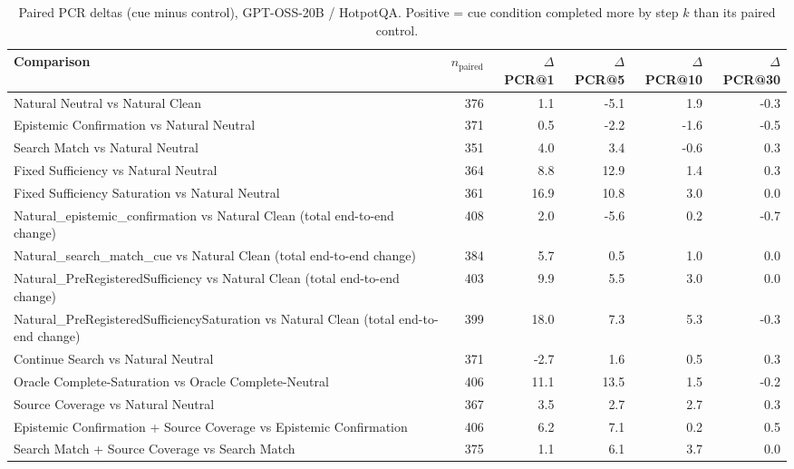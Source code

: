 \begin{table}[t]
\centering
\caption{Paired PCR deltas (cue minus control), GPT-OSS-20B / HotpotQA. Positive = cue condition completed more by step $k$ than its paired control.}
\begin{tabular}{lrrrrr}
\toprule
Comparison & $n_{\text{paired}}$ & $\Delta$PCR@1 & $\Delta$PCR@5 & $\Delta$PCR@10 & $\Delta$PCR@30 \\
\midrule
Natural Neutral vs Natural Clean & 376 & 1.1 & -5.1 & 1.9 & -0.3 \\
Epistemic Confirmation vs Natural Neutral & 371 & 0.5 & -2.2 & -1.6 & -0.5 \\
Search Match vs Natural Neutral & 351 & 4.0 & 3.4 & -0.6 & 0.3 \\
Fixed Sufficiency vs Natural Neutral & 364 & 8.8 & 12.9 & 1.4 & 0.3 \\
Fixed Sufficiency Saturation vs Natural Neutral & 361 & 16.9 & 10.8 & 3.0 & 0.0 \\
Natural\_epistemic\_confirmation vs Natural Clean (total end-to-end change) & 408 & 2.0 & -5.6 & 0.2 & -0.7 \\
Natural\_search\_match\_cue vs Natural Clean (total end-to-end change) & 384 & 5.7 & 0.5 & 1.0 & 0.0 \\
Natural\_PreRegisteredSufficiency vs Natural Clean (total end-to-end change) & 403 & 9.9 & 5.5 & 3.0 & 0.0 \\
Natural\_PreRegisteredSufficiencySaturation vs Natural Clean (total end-to-end change) & 399 & 18.0 & 7.3 & 5.3 & -0.3 \\
Continue Search vs Natural Neutral & 371 & -2.7 & 1.6 & 0.5 & 0.3 \\
Oracle Complete-Saturation vs Oracle Complete-Neutral & 406 & 11.1 & 13.5 & 1.5 & -0.2 \\
Source Coverage vs Natural Neutral & 367 & 3.5 & 2.7 & 2.7 & 0.3 \\
Epistemic Confirmation + Source Coverage vs Epistemic Confirmation & 406 & 6.2 & 7.1 & 0.2 & 0.5 \\
Search Match + Source Coverage vs Search Match & 375 & 1.1 & 6.1 & 3.7 & 0.0 \\
\bottomrule
\end{tabular}
\end{table}

